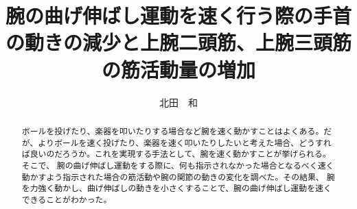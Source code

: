 \documentclass{jsarticle}
\title{腕の曲げ伸ばし運動を速く行う際の手首の動きの減少と上腕二頭筋、上腕三頭筋の筋活動量の増加}
\author{北田　和}
\begin{document}
\maketitle


\begin{abstract}

  ボールを投げたり、楽器を叩いたりする場合など腕を速く動かすことはよくある。だが、よりボールを速く投げたり、楽器を速く叩いたりしたいと考えた場合、どうすれば良いのだろうか。これを実現する手法として、腕を速く動かすことが挙げられる。
  そこで、
  腕の曲げ伸ばし運動をする際に、何も指示されなかった場合となるべく速く動かすよう指示された場合の筋活動や腕の関節の動きの変化を調べた。その結果、
  腕を力強く動かし、曲げ伸ばしの動きを小さくすることで、腕の曲げ伸ばし運動を速くできることがわかった。
\end{abstract}
\end{document}
